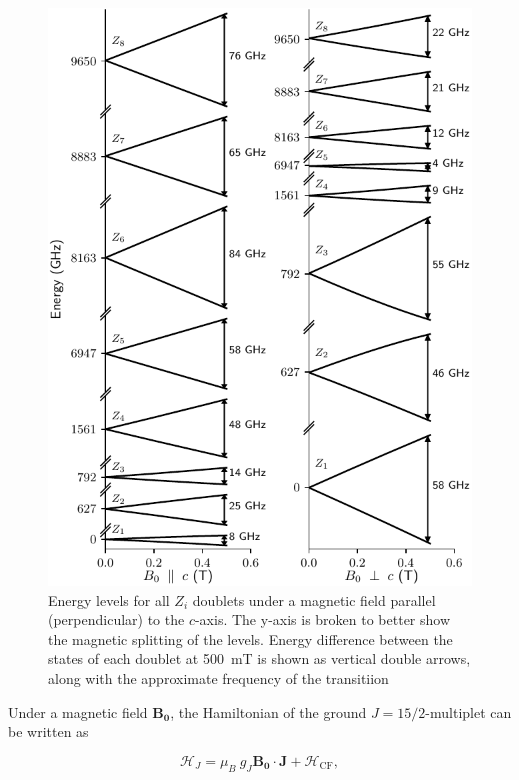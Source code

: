 \begin{figure}
    \includegraphics{chapter2/figures/energy_levels_vs_Bz_all.pdf}
    \caption{Energy levels for all $Z_i$ doublets under a magnetic field parallel (perpendicular) to the $c$-axis. The y-axis is broken to better show the magnetic splitting of the levels. Energy difference between the states of each doublet at 500~mT is shown as vertical double arrows, along with the approximate frequency of the transitiion}
\end{figure}

Under a magnetic field $\mathbf{B_0}$, the Hamiltonian of the ground $J=15/2$-multiplet can be written as 

\begin{equation}
    \label{eq:J-CF_Hamiltonian}
    \mathcal{H}_J = \mu_B \ g_J\mathbf{B_0}\cdot \mathbf{J} + \mathcal{H}_{\mathrm{CF}},
\end{equation}


